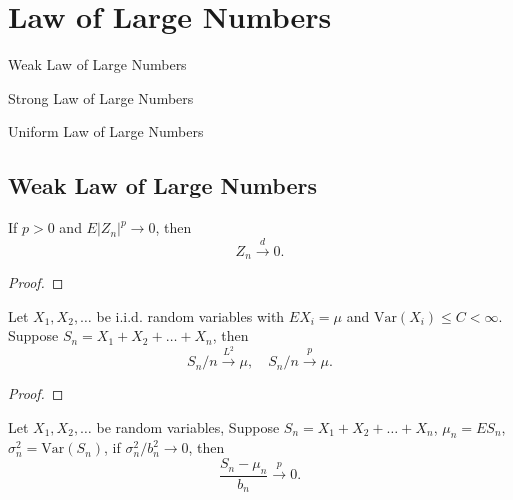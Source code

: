 \chapter{Law of Large Numbers}

\begin{introduction}
    \item Weak Law of Large Numbers
    \item Strong Law of Large Numbers
    \item Uniform Law of Large Numbers
\end{introduction}

\section{Weak Law of Large Numbers}

\begin{lemma}
    If $p>0$ and $E\left|Z_{n}\right|^{p}\rightarrow 0$, then
    \begin{equation}
        Z_{n}\stackrel{d}{\rightarrow}0.
    \end{equation}
\end{lemma}

\begin{proof}

\end{proof}

\begin{theorem}
    Let $X_1,X_2,\ldots$ be i.i.d. random variables with $EX_i=\mu$ and $\text{Var}(X_i)\leq C<\infty$. Suppose $S_n=X_1+X_2+\ldots+X_n$, then
    \begin{equation}
        S_n/n\stackrel{L^2}{\rightarrow}\mu,\quad S_n/n\stackrel{p}{\rightarrow}\mu.
    \end{equation}
\end{theorem}

\begin{proof}

\end{proof}

\begin{theorem}
    Let $X_1,X_2,\ldots$ be random variables, Suppose $S_n=X_1+X_2+\ldots+X_n$, $\mu_n=ES_n$, $\sigma_n^2=\text{Var}(S_n)$, if $\sigma_n^2/b_n^2\rightarrow 0$, then
    \begin{equation}
        \frac{S_n-\mu_n}{b_n}\stackrel{p}{\rightarrow}0.
    \end{equation}
\end{theorem}

